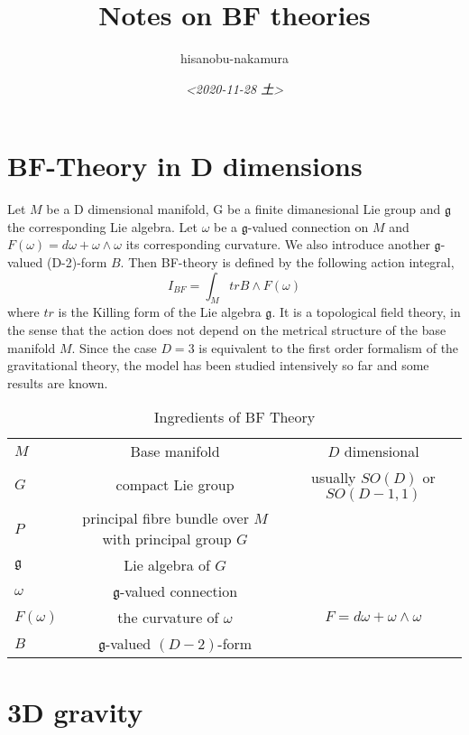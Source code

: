 \documentclass{article}
\author{hisanobu-nakamura}
\date{\textit{<2020-11-28 土>}}
\title{Notes on BF theories}
\begin{document}
\maketitle
\tableofcontents



\section{BF-Theory in D dimensions}
\label{sec-1}
Let $M$ be a D dimensional manifold, G be a finite dimanesional Lie group and $\mathfrak{g}$ the corresponding Lie algebra. Let $\omega$ be a $\mathfrak{g}$-valued connection on $M$ and $F(\omega) = d\omega + \omega \wedge \omega$ its corresponding curvature. We also introduce another $\mathfrak{g}$-valued (D-2)-form $B$. Then BF-theory is defined by the following action integral,
\begin{equation}
\label{}
I_{BF} = \int_{M}tr B\wedge F(\omega)
\end{equation}
where $tr$ is the Killing form of the Lie algebra $\mathfrak{g}$. It is a topological field theory, in the sense that the action does not depend on the metrical structure of the base manifold $M$. Since the case $D = 3$ is equivalent to the first order formalism of the gravitational theory, the model has been studied intensively so far and some results are known. 
\begin{table}[htb]
  \centering 
  \caption{Ingredients of BF Theory}\label{}
  \begin{tabular}{|l|c|c|}
\hline
  $M$ & Base manifold & $D$ dimensional  \\
  $G$ & compact Lie group &  usually $SO(D)$ or $SO(D-1,1)$\\
  $P$ & principal fibre bundle over $M$ with principal group $G$ & \\
  $\mathfrak{g}$ & Lie algebra of $G$ &  \\
  $\omega$ & $\mathfrak{g}$-valued connection & \\
  $F(\omega)$ & the curvature of $\omega$ & $F= d\omega + \omega \wedge \omega$\\
  $B$ & $\mathfrak{g}$-valued $(D-2)$-form & \\
\hline
\end{tabular}
\end{table} 

\section{3D gravity}
\label{sec-2}
\end{document}
